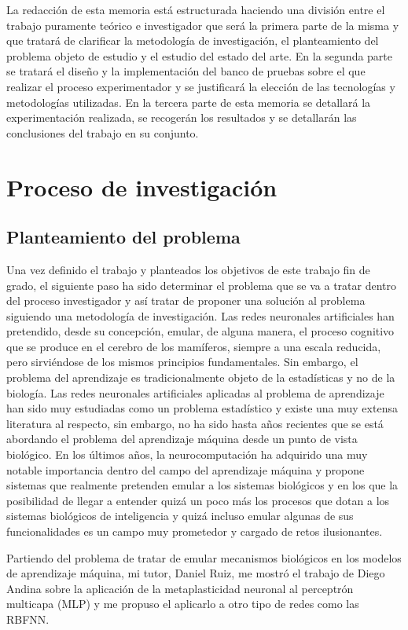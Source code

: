\documentclass[10pt,a4paper, twocolumn]{report}
\begin{document}
La redacción de esta memoria está estructurada haciendo una división entre el trabajo puramente teórico e investigador que será la primera parte de la misma y que tratará de clarificar la metodología de investigación, el planteamiento del problema objeto de estudio y el estudio del estado del arte. En la segunda parte se tratará el diseño y la implementación del banco de pruebas sobre el que realizar el proceso experimentador y se justificará la elección de las tecnologías y metodologías utilizadas. En la tercera parte de esta memoria se detallará la experimentación realizada, se recogerán los resultados y se detallarán las conclusiones del trabajo en su conjunto. 

\chapter{Proceso de investigación}
\section{Planteamiento del problema}
Una vez definido el trabajo y planteados los objetivos de este trabajo fin de grado, el siguiente paso ha sido determinar el problema que se va a tratar dentro del proceso investigador y así tratar de proponer una solución al problema siguiendo una metodología de investigación.
Las redes neuronales artificiales han pretendido, desde su concepción, emular, de alguna manera, el proceso cognitivo que se produce en el cerebro de los mamíferos, siempre a una escala reducida, pero sirviéndose de los mismos principios fundamentales. Sin embargo, el problema del aprendizaje es tradicionalmente objeto de la estadísticas y no de la biología. Las redes neuronales artificiales aplicadas al problema de aprendizaje han sido muy estudiadas como un problema estadístico y existe una muy extensa literatura al respecto, sin embargo, no ha sido hasta años recientes que se está abordando el problema del aprendizaje máquina desde un punto de vista biológico. En los últimos años, la neurocomputación ha adquirido una muy notable importancia dentro del campo del aprendizaje máquina y propone sistemas que realmente pretenden emular a los sistemas biológicos y en los que la posibilidad de llegar a entender quizá un poco más los procesos que dotan a los sistemas biológicos de inteligencia y quizá incluso emular algunas de sus funcionalidades es un campo muy prometedor y cargado de retos ilusionantes.

Partiendo del problema de tratar de emular mecanismos biológicos en los modelos de aprendizaje máquina, mi tutor, Daniel Ruiz, me mostró el trabajo de Diego Andina sobre la aplicación de la metaplasticidad neuronal al perceptrón multicapa (MLP) y me propuso el aplicarlo a otro tipo de redes como las RBFNN.
\end{document}
